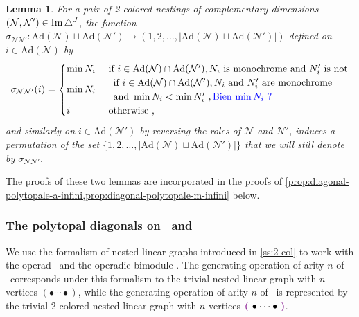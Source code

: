 \documentclass[twoside, 11pt]{amsart}
\newtheorem{lemma}[definition]{Lemma}
\theoremstyle{remark}
\begin{document}
\begin{lemma} 
\label{prop:signs-mul}
For a pair of 2-colored nestings of complementary dimensions $(\mathcal{N},\mathcal{N}')\in \operatorname{Im}\triangle^J$, the function $\sigma_{\mathcal{N}\mathcal{N}'}: \mathrm{Ad}(\mathcal{N})\sqcup \mathrm{Ad}(\mathcal{N}') \to (1,2,\ldots,|\mathrm{Ad}(\mathcal{N})\sqcup \mathrm{Ad}(\mathcal{N}')|)$ defined on $i \in \mathrm{Ad}(\mathcal{N})$ by
\begin{equation*}
  \sigma_{\mathcal{N}\mathcal{N}'}(i)= 
  \begin{cases}
    \min N_i & \text{ if } i \in \mathrm{Ad}(\mathcal{N})\cap \mathrm{Ad}(\mathcal{N}') , N_i \text{ is monochrome and } N_i' \text{ is not} \\
    \min N_i & \begin{array}{l}
         \text{ if } i \in \mathrm{Ad}(\mathcal{N})\cap \mathrm{Ad}(\mathcal{N}'), N_i \text{ and } N_i' \text{ are monochrome} \\
         \text{ and } \min N_i < \min N_i' \ , \text{\textcolor{blue}{Bien $\min N_i$ ?}}
    \end{array}   \\ 
    i & \text{ otherwise ,} 
  \end{cases}
\end{equation*}
and similarly on $i \in \mathrm{Ad}(\mathcal{N}')$ by reversing the roles of $\mathcal{N}$ and $\mathcal{N}'$, induces a permutation of the set $\{1,2,\ldots,|\mathrm{Ad}(\mathcal{N})\sqcup \mathrm{Ad}(\mathcal{N}')|\}$ that we will still denote by $\sigma_{\mathcal{N}\mathcal{N}'}$.
\end{lemma}

\noindent The proofs of these two lemmas are incorporated in the proofs of \cref{prop:diagonal-polytopale-a-infini,prop:diagonal-polytopale-m-infini} below. 

\subsubsection{The polytopal diagonals on \Ainf\ and \Minf}

We use the formalism of nested linear graphs introduced in \cref{ss:2-col} to work with the operad \Ainf\ and the operadic bimodule \Minf . The generating operation of arity $n$ of \Ainf\ corresponds under this formalism to the trivial nested linear graph with $n$ vertices $(\bullet \cdots \bullet )$, while the generating operation of arity $n$ of \Minf\ is represented by the trivial 2-colored nested linear graph with $n$ vertices $\purple{\bullet \cdots \bullet}$.
\end{document}

